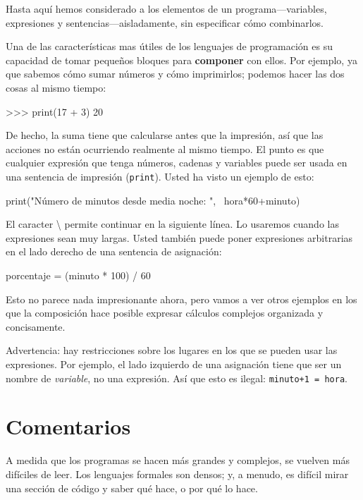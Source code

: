 
Hasta aquí hemos considerado a los elementos de un programa—variables,
expresiones y sentencias—aisladamente, sin especificar cómo combinarlos.

Una de las características mas útiles de los lenguajes de programación
es su capacidad de tomar pequeños bloques para \textbf{componer} con
ellos. Por ejemplo, ya que sabemos cómo sumar números y cómo imprimirlos;
podemos hacer las dos cosas al mismo tiempo:

\begin{pyconcode}
>>> print(17 + 3)
20
\end{pyconcode}
 De hecho, la suma tiene que calcularse antes que la impresión, así
que las acciones no están ocurriendo realmente al mismo tiempo. El
punto es que cualquier expresión que tenga números, cadenas y variables
puede ser usada en una sentencia de impresión (\texttt{print}). Usted
ha visto un ejemplo de esto:

\begin{pythoncode}
print("Número de minutos desde media noche: ",  \
  hora*60+minuto)
\end{pythoncode}
 El caracter \textbackslash{} permite continuar en la siguiente línea.
Lo usaremos cuando las expresiones sean muy largas. Usted también
puede poner expresiones arbitrarias en el lado derecho de una sentencia
de asignación:

\begin{pythoncode}
porcentaje = (minuto * 100) / 60
\end{pythoncode}
 Esto no parece nada impresionante ahora, pero vamos a ver otros ejemplos
en los que la composición hace posible expresar cálculos complejos
organizada y concisamente.

Advertencia: hay restricciones sobre los lugares en los que se pueden
usar las expresiones. Por ejemplo, el lado izquierdo de una asignación
tiene que ser un nombre de {\em variable}, no una expresión. Así
que esto es ilegal: \texttt{minuto+1 = hora}.

\section{Comentarios}


A medida que los programas se hacen más grandes y complejos, se vuelven
más difíciles de leer. Los lenguajes formales son densos; y, a menudo,
es difícil mirar una sección de código y saber qué hace, o por qué
lo hace.

